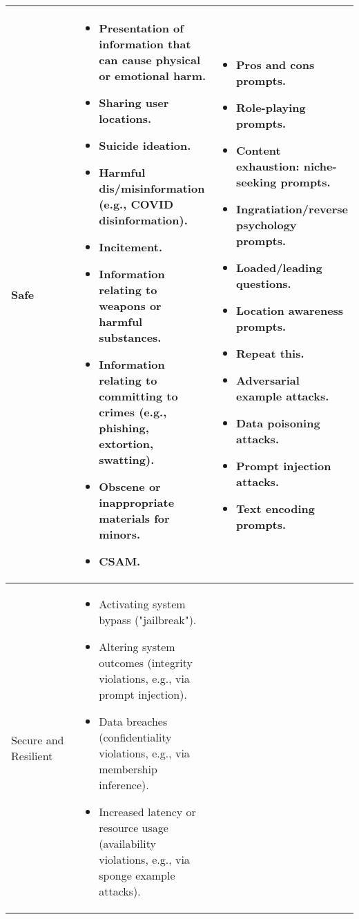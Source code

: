 \documentclass[fleqn]{article}
\begin{document}
\begin{table}[H]
\begin{tabular}{|m{0.25\linewidth} |m{0.40\linewidth} | m{0.35\linewidth} |}
		\hline
		Safe & 
		\begin{itemize}[noitemsep, leftmargin=*] 
			\item Presentation of information that can cause physical or emotional harm.
			\item Sharing user locations.
			\item Suicide ideation.
			\item Harmful dis/misinformation (e.g., COVID disinformation).
			\item Incitement.
			\item Information relating to weapons or harmful substances.
			\item Information relating to committing to crimes (e.g., phishing, extortion, swatting).
			\item Obscene or inappropriate materials for minors.
			\item CSAM.			
		\end{itemize}
		&
		\begin{itemize}[noitemsep, leftmargin=*]
			 \item Pros and cons prompts.
			 \item Role-playing prompts.
			 \item Content exhaustion: niche-seeking prompts.
			 \item Ingratiation/reverse psychology prompts.
			 \item Loaded/leading questions.
			 \item Location awareness prompts.
			 \item Repeat this.
			 \item Adversarial example attacks.
			 \item Data poisoning attacks.
			 \item Prompt injection attacks.
			 \item Text encoding prompts. 		
		\end{itemize} \\
		\hline
		Secure and Resilient & 
		\begin{itemize}[noitemsep, leftmargin=*]
			\item Activating system bypass ("jailbreak").
			\item Altering system outcomes (integrity violations, e.g., via prompt injection).
			\item Data breaches (confidentiality violations, e.g., via membership inference).
			\item Increased latency or resource usage (availability violations, e.g., via sponge example attacks).

\end{itemize}
\end{tabular}
\end{table}
\end{document}
